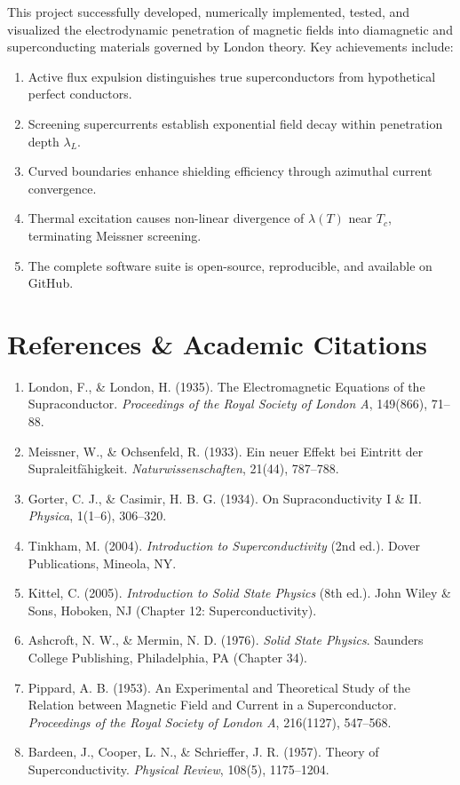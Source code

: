 \documentclass[11pt,a4paper]{article}
\begin{document}
This project successfully developed, numerically implemented, tested, and visualized the electrodynamic penetration of magnetic fields into diamagnetic and superconducting materials governed by London theory. Key achievements include:
\begin{enumerate}
    \item Active flux expulsion distinguishes true superconductors from hypothetical perfect conductors.
    \item Screening supercurrents establish exponential field decay within penetration depth $\lambda_L$.
    \item Curved boundaries enhance shielding efficiency through azimuthal current convergence.
    \item Thermal excitation causes non-linear divergence of $\lambda(T)$ near $T_c$, terminating Meissner screening.
    \item The complete software suite is open-source, reproducible, and available on GitHub.
\end{enumerate}

\section{References \& Academic Citations}

\begin{enumerate}
    \item London, F., \& London, H. (1935). The Electromagnetic Equations of the Supraconductor. \textit{Proceedings of the Royal Society of London A}, 149(866), 71--88.
    \item Meissner, W., \& Ochsenfeld, R. (1933). Ein neuer Effekt bei Eintritt der Supraleitf\"ahigkeit. \textit{Naturwissenschaften}, 21(44), 787--788.
    \item Gorter, C. J., \& Casimir, H. B. G. (1934). On Supraconductivity I \& II. \textit{Physica}, 1(1--6), 306--320.
    \item Tinkham, M. (2004). \textit{Introduction to Superconductivity} (2nd ed.). Dover Publications, Mineola, NY.
    \item Kittel, C. (2005). \textit{Introduction to Solid State Physics} (8th ed.). John Wiley \& Sons, Hoboken, NJ (Chapter 12: Superconductivity).
    \item Ashcroft, N. W., \& Mermin, N. D. (1976). \textit{Solid State Physics}. Saunders College Publishing, Philadelphia, PA (Chapter 34).
    \item Pippard, A. B. (1953). An Experimental and Theoretical Study of the Relation between Magnetic Field and Current in a Superconductor. \textit{Proceedings of the Royal Society of London A}, 216(1127), 547--568.
    \item Bardeen, J., Cooper, L. N., \& Schrieffer, J. R. (1957). Theory of Superconductivity. \textit{Physical Review}, 108(5), 1175--1204.
\end{enumerate}
\end{document}
